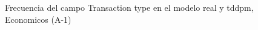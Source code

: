 \begin{figure}[H]
    \centering
    
    \caption{Frecuencia del campo Transaction type en el modelo real y tddpm, Economicos (A-1)}
    \label{frecuency-Transaction Type-tddpm_mlp}
\end{figure}